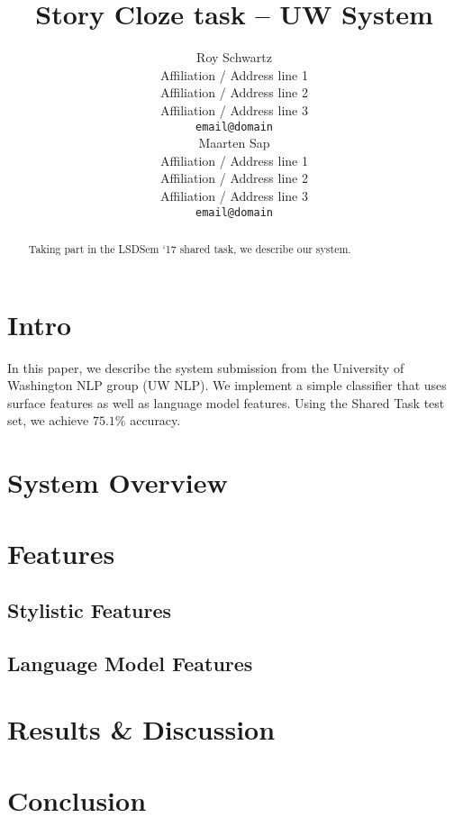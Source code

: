 \documentclass[11pt]{article}
\title{Story Cloze task -- UW System}
\author{Roy Schwartz\\
  Affiliation / Address line 1 \\
  Affiliation / Address line 2 \\
  Affiliation / Address line 3 \\
  {\tt email@domain} \\\And	
  Maarten Sap \\
  Affiliation / Address line 1 \\
  Affiliation / Address line 2 \\
  Affiliation / Address line 3 \\
  {\tt email@domain} \\}
\date{}
\begin{document}
\maketitle
\begin{abstract}
Taking part in the LSDSem `17 shared task, we describe our system.

\end{abstract}

\section{Intro}
In this paper, we describe the system submission from the University of Washington NLP group (UW NLP).
We implement a simple classifier that uses surface features as well as language model features. Using the Shared Task test set, we achieve $75.1\%$ accuracy.

\section{System Overview}

\section{Features}
\subsection{Stylistic Features}

\subsection{Language Model Features}

\section{Results \& Discussion}


\section{Conclusion}




\end{document}
